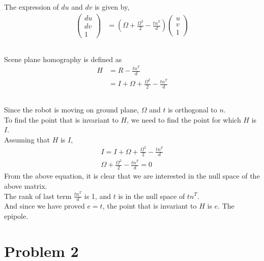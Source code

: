 \documentclass{article}
\begin{document}
\subsubsection{}
The expression of $du$ and $dv$ is given by,
\begin{align*}
\begin{pmatrix} du\\  dv\\ 1 \end{pmatrix} &= (\Omega + \frac{\Omega^2}{2} - \frac{t n^T}{d}) \begin{pmatrix} u\\ v\\ 1 \end{pmatrix} \\
\end{align*}


\subsubsection{}
Scene plane homography is defined as
\begin{align*}
H &= R - \frac{t n^T}{d} \\
&= I + \Omega + \frac{\Omega^2}{2} - \frac{t n^T}{d} \\
\end{align*}


\subsubsection{}
Since the robot is moving on ground plane, $\Omega$ and $t$ is orthogonal to $n$. \\
To find the point that is invariant to $H$, we need to find the point for which $H$ is $I$. \\
Assuming that $H$ is $I$,
\begin{align*}
I = I + \Omega + \frac{\Omega^2}{2} - \frac{t n^T}{d} \\
\Omega + \frac{\Omega^2}{2} - \frac{t n^T}{d} = 0
\end{align*}
From the above equation, it is clear that we are interested in the null space of the above matrix. \\
The rank of last term $\frac{t n^T}{d}$ is 1, and $t$ is in the null space of $t n^T$. \\
And since we have proved $e = t$, the point that is invariant to $H$ is $e$. The epipole.


\section{Problem 2}
\end{document}
